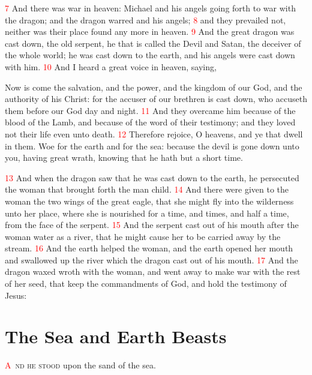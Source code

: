 \documentclass[12pt,twoside]{memoir}
\newcommand{\vnum}[1]{\textcolor{red}{\normalsize{#1}}}
\begin{document}
\vnum{7} And there was war in heaven: Michael and his angels going forth to war with the dragon; and the dragon warred and his angels; 
\vnum{8} and they prevailed not, neither was their place found any more in heaven. 
\vnum{9} And the great dragon was cast down, the old serpent, he that is called the Devil and Satan, the deceiver of the whole world; he was cast down to the earth, and his angels were cast down with him. 
\vnum{10} And I heard a great voice in heaven, saying,

Now is come the salvation, and the power, and the kingdom of our God, and the authority of his Christ: for the accuser of our brethren is cast down, who accuseth them before our God day and night. 
\vnum{11} And they overcame him because of the blood of the Lamb, and because of the word of their testimony; and they loved not their life even unto death. 
\vnum{12} Therefore rejoice, O heavens, and ye that dwell in them. Woe for the earth and for the sea: because the devil is gone down unto you, having great wrath, knowing that he hath but a short time.

\vnum{13} And when the dragon saw that he was cast down to the earth, he persecuted the woman that brought forth the man child. 
\vnum{14} And there were given to the woman the two wings of the great eagle, that she might fly into the wilderness unto her place, where she is nourished for a time, and times, and half a time, from the face of the serpent. 
\vnum{15} And the serpent cast out of his mouth after the woman water as a river, that he might cause her to be carried away by the stream. 
\vnum{16} And the earth helped the woman, and the earth opened her mouth and swallowed up the river which the dragon cast out of his mouth. 
\vnum{17} And the dragon waxed wroth with the woman, and went away to make war with the rest of her seed, that keep the commandments of God, and hold the testimony of Jesus: 


\chapter{The Sea and Earth Beasts}
\lettrine[lines=3]{\textcolor{red}{A}}{\ nd he stood} upon the sand of the sea.
\end{document}
